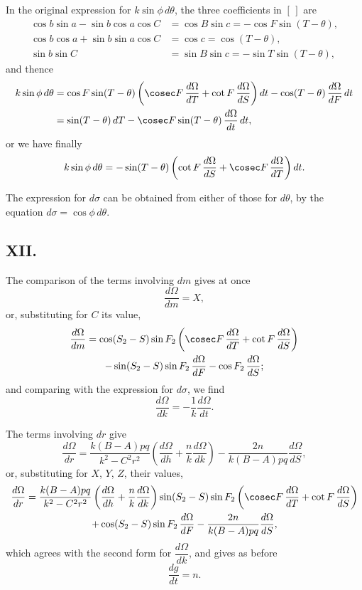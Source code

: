 \documentclass[11pt,a4paper]{book}
\begin{document}
In the original expression for $k\sin\phi\,d\theta$, the three coefficients in $[\,]$ are
\begin{align*}
\cos b\sin a - \sin b\cos a\cos C &= \cos B\sin c = -\cos F\sin(T-\theta), \\
\cos b\cos a + \sin b\sin a\cos C &= \cos c = \cos(T-\theta), \\
\sin b\sin C &= \sin B\sin c = -\sin T\sin(T-\theta),
\end{align*}
and thence
\begin{align*}
k\sin\phi\,d\theta &= \cos F\sin(T-\theta)\left(\cosec F\,\frac{d\Omega}{dT} + \cot F\,\frac{d\Omega}{dS}\right)dt - \cos(T-\theta)\,\frac{d\Omega}{dF}\,dt \\
&= \sin(T-\theta)\,dT - \cosec F\sin(T-\theta)\,\frac{d\Omega}{dt}\,dt,
\end{align*}
or we have finally
\[
k\sin\phi\,d\theta = -\sin(T-\theta)\left(\cot F\,\frac{d\Omega}{dS} + \cosec F\,\frac{d\Omega}{dT}\right)dt.
\]

The expression for $d\sigma$ can be obtained from either of those for $d\theta$, by the equation $d\sigma = \cos\phi\,d\theta$.

\subsection*{XII.}

The comparison of the terms involving $dm$ gives at once
\[
\frac{d\Omega}{dm} = X,
\]
or, substituting for $C$ its value,
\begin{multline*}
\frac{d\Omega}{dm} = \cos(S_2-S)\sin F_2\left(\cosec F\,\frac{d\Omega}{dT} + \cot F\,\frac{d\Omega}{dS}\right) \\
- \sin(S_2-S)\sin F_2\,\frac{d\Omega}{dF} - \cos F_2\,\frac{d\Omega}{dS};
\end{multline*}
and comparing with the expression for $d\sigma$, we find
\[
\frac{d\Omega}{dk} = -\frac{1}{k}\frac{d\Omega}{dt}.
\]

The terms involving $dr$ give
\[
\frac{d\Omega}{dr} = \frac{k(B-A)pq}{k^2-C^2r^2}\left(\frac{d\Omega}{dh} + \frac{n}{k}\frac{d\Omega}{dk}\right) - \frac{2n}{k(B-A)pq}\frac{d\Omega}{dS},
\]
or, substituting for $X$, $Y$, $Z$, their values,
\begin{multline*}
\frac{d\Omega}{dr} = \frac{k(B-A)pq}{k^2-C^2r^2}\left(\frac{d\Omega}{dh} + \frac{n}{k}\frac{d\Omega}{dk}\right)\sin(S_2-S)\sin F_2\left(\cosec F\,\frac{d\Omega}{dT} + \cot F\,\frac{d\Omega}{dS}\right) \\
+ \cos(S_2-S)\sin F_2\,\frac{d\Omega}{dF} - \frac{2n}{k(B-A)pq}\frac{d\Omega}{dS},
\end{multline*}
which agrees with the second form for $\dfrac{d\Omega}{dk}$, and gives as before
\[
\frac{dg}{dt} = n.
\]
\end{document}
